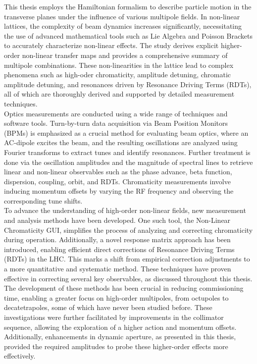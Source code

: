 {%
This thesis employs the Hamiltonian formalism to describe particle motion in the transverse planes
under the influence of various multipole fields. In non-linear lattices, the complexity of beam
dynamics increases significantly, necessitating the use of advanced mathematical tools such as Lie
Algebra and Poisson Brackets to accurately characterize non-linear effects. The study derives
explicit higher-order non-linear transfer maps and provides a comprehensive summary of multipole
combinations. These non-linearities in the lattice lead to complex phenomena such as high-oder 
chromaticity, amplitude detuning, chromatic amplitude detuning, and resonances driven by Resonance
Driving Terms (RDTs), all of which are thoroughly derived and supported by detailed measurement
techniques.
\\
\indent
Optics measurements are conducted using a wide range of techniques and software tools. Turn-by-turn
data acquisition via Beam Position Monitors (BPMs) is emphasized as a crucial method for evaluating
beam optics, where an AC-dipole excites the beam, and the resulting oscillations are analyzed using
Fourier transforms to extract tunes and identify resonances. Further treatment is done via the
oscillation amplitudes and the magnitude of spectral lines to retrieve linear and non-linear
observables such as the phase advance, beta function, dispersion, coupling, orbit, and RDTs.
Chromaticity measurements involve inducing momentum offsets by varying the RF frequency and
observing the corresponding tune shifts.
\\
\indent
To advance the understanding of high-order non-linear fields, new measurement and analysis methods
have been developed. One such tool, the Non-Linear Chromaticity GUI, simplifies the process of
analyzing and correcting chromaticity during operation. Additionally, a novel response matrix
approach has been introduced, enabling efficient direct corrections of Resonance Driving Terms
(RDTs) in the LHC. This marks a shift from empirical correction adjustments to a more quantitative
and systematic method. These techniques have proven effective in correcting several key observables,
as discussed throughout this thesis. The development of these methods has been crucial in reducing
commissioning time, enabling a greater focus on high-order multipoles, from octupoles to
decatetrapoles, some of which have never been studied before. These investigations were further
facilitated by improvements in the collimator sequence, allowing the exploration of a higher action
and momentum offsets. Additionally, enhancements in dynamic aperture, as presented in this thesis,
provided the required amplitudes to probe these higher-order effects more effectively.


}
